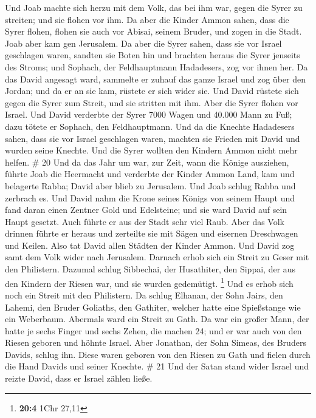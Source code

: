  Und Joab machte sich herzu mit dem Volk, das bei ihm war,
gegen die Syrer zu streiten; und sie flohen vor ihm.  Da
aber die Kinder Ammon sahen, dass die Syrer flohen, flohen sie auch vor
Abisai, seinem Bruder, und zogen in die Stadt. Joab aber kam gen
Jerusalem.  Da aber die Syrer sahen, dass sie vor Israel
geschlagen waren, sandten sie Boten hin und brachten heraus die Syrer
jenseits des Stroms; und Sophach, der Feldhauptmann Hadadesers, zog vor
ihnen her.  Da das David angesagt ward, sammelte er zuhauf
das ganze Israel und zog über den Jordan; und da er an sie kam, rüstete
er sich wider sie. Und David rüstete sich gegen die Syrer zum Streit,
und sie stritten mit ihm.  Aber die Syrer flohen vor
Israel. Und David verderbte der Syrer 7000 Wagen und 40.000 Mann zu Fuß;
dazu tötete er Sophach, den Feldhauptmann.  Und da die
Knechte Hadadesers sahen, dass sie vor Israel geschlagen waren, machten
sie Frieden mit David und wurden seine Knechte. Und die Syrer wollten
den Kindern Ammon nicht mehr helfen. \# 20  Und da das Jahr
um war, zur Zeit, wann die Könige ausziehen, führte Joab die Heermacht
und verderbte der Kinder Ammon Land, kam und belagerte Rabba; David aber
blieb zu Jerusalem. Und Joab schlug Rabba und zerbrach es. 
Und David nahm die Krone seines Königs von seinem Haupt und fand daran
einen Zentner Gold und Edelsteine; und sie ward David auf sein Haupt
gesetzt. Auch führte er aus der Stadt sehr viel Raub.  Aber
das Volk drinnen führte er heraus und zerteilte sie mit Sägen und
eisernen Dreschwagen und Keilen. Also tat David allen Städten der Kinder
Ammon. Und David zog samt dem Volk wider nach Jerusalem. 
Darnach erhob sich ein Streit zu Geser mit den Philistern. Dazumal
schlug Sibbechai, der Husathiter, den Sippai, der aus den Kindern der
Riesen war, und sie wurden gedemütigt. \footnote{\textbf{20:4} 1Chr
  27,11}  Und es erhob sich noch ein Streit mit den
Philistern. Da schlug Elhanan, der Sohn Jairs, den Lahemi, den Bruder
Goliaths, den Gathiter, welcher hatte eine Spießstange wie ein
Weberbaum.  Abermals ward ein Streit zu Gath. Da war ein
großer Mann, der hatte je sechs Finger und sechs Zehen, die machen 24;
und er war auch von den Riesen geboren  und höhnte Israel.
Aber Jonathan, der Sohn Simeas, des Bruders Davids, schlug ihn.
 Diese waren geboren von den Riesen zu Gath und fielen durch
die Hand Davids und seiner Knechte. \# 21  Und der Satan
stand wider Israel und reizte David, dass er Israel zählen ließe.
